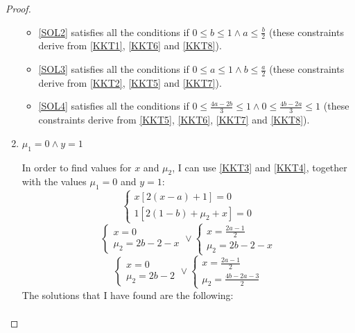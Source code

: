 \begin{proof}
\begin{enumerate}
\begin{itemize}
                \item \eqref{SOL2} satisfies all the conditions if \(0 \leq b \leq 1 \land a \leq \frac{b}{2}\) (these constraints derive from \eqref{KKT1}, \eqref{KKT6} and \eqref{KKT8}).
                \item \eqref{SOL3} satisfies all the conditions if \(0 \leq a \leq 1 \land b \leq \frac{a}{2}\) (these constraints derive from \eqref{KKT2}, \eqref{KKT5} and \eqref{KKT7}).
                \item \eqref{SOL4} satisfies all the conditions if \(0 \leq \frac{4a-2b}{3} \leq 1 \land 0 \leq \frac{4b-2a}{3} \leq 1\) (these constraints derive from \eqref{KKT5}, \eqref{KKT6}, \eqref{KKT7} and \eqref{KKT8}).
            \end{itemize}
        \item \(\mu_1 = 0 \land y = 1\)\par
            In order to find values for \(x\) and \(\mu_2\), I can use \eqref{KKT3} and \eqref{KKT4}, together with the values \(\mu_1 = 0\) and \(y = 1\):
            \[
                \begin{cases}
                    x[2(x-a) + 1] = 0 \\
                    1[2(1-b) + \mu_2 + x] = 0
                \end{cases}
            \]
            \[
                \begin{cases}
                    x = 0 \\
                    \mu_2 = 2b - 2 - x
                \end{cases}
                \lor
                \begin{cases}
                    x = \frac{2a-1}{2} \\
                    \mu_2 = 2b - 2 - x
                \end{cases}
            \]
            \[
                \begin{cases}
                    x = 0 \\
                    \mu_2 = 2b - 2
                \end{cases}
                \lor
                \begin{cases}
                    x = \frac{2a-1}{2} \\
                    \mu_2 = \frac{4b - 2a - 3}{2}
                \end{cases}
            \]
            The solutions that I have found are the following:
            \begin{gather}

\end{gather}
\end{enumerate}
\end{proof}
